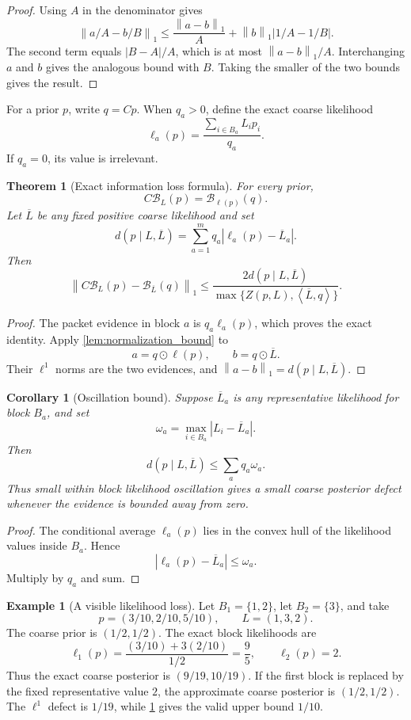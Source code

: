 \documentclass{aomart}
\newtheorem{theorem}{Theorem}[section]
\newtheorem{corollary}[corollary]{Corollary}
\theoremstyle{definition}
\newtheorem{example}[example]{Example}
\theoremstyle{remark}
\newcommand{\Bcal}{\mathcal B}
\newcommand{\norm}[1]{\left\lVert#1\right\rVert}
\newcommand{\abs}[1]{\left\lvert#1\right\rvert}
\newcommand{\ip}[2]{\left\langle#1,#2\right\rangle}
\begin{document}
\begin{proof}
Using \(A\) in the denominator gives
\[
\norm{a/A-b/B}_1
\leq
\frac{\norm{a-b}_1}{A}
+
\norm b_1\abs{1/A-1/B}.
\]
The second term equals \(\abs{B-A}/A\), which is at most \(\norm{a-b}_1/A\). Interchanging \(a\) and \(b\) gives the analogous bound with \(B\). Taking the smaller of the two bounds gives the result.
\end{proof}

For a prior \(p\), write \(q=Cp\). When \(q_a>0\), define the exact coarse likelihood
\[
\ell_a(p)
=
\frac{\sum_{i\in B_a}L_ip_i}{q_a}.
\]
If \(q_a=0\), its value is irrelevant.

\begin{theorem}[Exact information loss formula]\label{thm:information_loss}
For every prior,
\[
\boxed{
C\Bcal_L(p)
=
\Bcal_{\ell(p)}(q).
}
\]
Let \(\overline L\) be any fixed positive coarse likelihood and set
\[
d(p\mid L,\overline L)
=
\sum_{a=1}^mq_a\abs{\ell_a(p)-\overline L_a}.
\]
Then
\[
\norm{
C\Bcal_L(p)-\Bcal_{\overline L}(q)
}_1
\leq
\frac{2d(p\mid L,\overline L)}
{\max\{Z(p,L),\ip{\overline L}{q}\}}.
\]
\end{theorem}

\begin{proof}
The packet evidence in block \(a\) is \(q_a\ell_a(p)\), which proves the exact identity. Apply \cref{lem:normalization_bound} to
\[
a=q\odot\ell(p),
\qquad
b=q\odot\overline L.
\]
Their \(\ell^1\) norms are the two evidences, and \(\norm{a-b}_1=d(p\mid L,\overline L)\).
\end{proof}

\begin{corollary}[Oscillation bound]\label{cor:bayes_oscillation}
Suppose \(\overline L_a\) is any representative likelihood for block \(B_a\), and set
\[
\omega_a
=
\max_{i\in B_a}\abs{L_i-\overline L_a}.
\]
Then
\[
d(p\mid L,\overline L)
\leq
\sum_aq_a\omega_a.
\]
Thus small within block likelihood oscillation gives a small coarse posterior defect whenever the evidence is bounded away from zero.
\end{corollary}

\begin{proof}
The conditional average \(\ell_a(p)\) lies in the convex hull of the likelihood values inside \(B_a\). Hence
\[
\abs{\ell_a(p)-\overline L_a}\leq\omega_a.
\]
Multiply by \(q_a\) and sum.
\end{proof}


\begin{example}[A visible likelihood loss]\label{ex:bayes_information_loss}
Let \(B_1=\{1,2\}\), let \(B_2=\{3\}\), and take
\[
p=(3/10,2/10,5/10),
\qquad
L=(1,3,2).
\]
The coarse prior is \((1/2,1/2)\). The exact block likelihoods are
\[
\ell_1(p)=\frac{(3/10)+3(2/10)}{1/2}=\frac95,
\qquad
\ell_2(p)=2.
\]
Thus the exact coarse posterior is \((9/19,10/19)\). If the first block is replaced by the fixed representative value \(2\), the approximate coarse posterior is \((1/2,1/2)\). The \(\ell^1\) defect is \(1/19\), while \cref{thm:information_loss} gives the valid upper bound \(1/10\).
\end{example}
\end{document}
